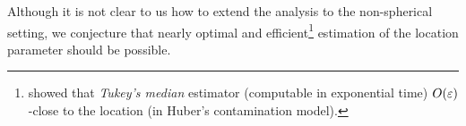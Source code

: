 Although it is not clear to us how to extend the analysis to the non-spherical setting, we conjecture that nearly optimal and efficient\footnote{\cite{chen2018robust} showed that \emph{Tukey's median} estimator (computable in exponential time) $O(\varepsilon)$-close to the location (in Huber's contamination model).} estimation of the location parameter should be possible. 